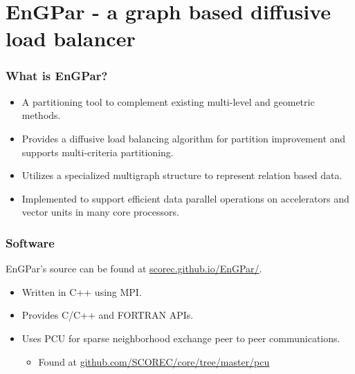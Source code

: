 \documentclass{beamer}
\begin{document}

\section{EnGPar - a graph based diffusive load balancer}

\begin{frame}
  \frametitle{What is EnGPar?}
  \begin{itemize}
  \item A partitioning tool to complement existing multi-level and geometric methods.
  \item Provides a diffusive load balancing algorithm for partition improvement and supports multi-criteria partitioning.
  \item Utilizes a specialized multigraph structure to represent relation based data.
  \item Implemented to support efficient data parallel operations on accelerators and vector units in many core processors.
  \end{itemize}
\end{frame}

\begin{frame}
  \frametitle{Software}
  EnGPar's source can be found at \url{scorec.github.io/EnGPar/}.
  \begin{itemize}
  \item Written in C++ using MPI.
  \item Provides C/C++ and FORTRAN APIs.
  \item Uses PCU for sparse neighborhood exchange peer to peer communications.
    \begin{itemize}
      \item Found at \url{github.com/SCOREC/core/tree/master/pcu}
      \end{itemize}
  \end{itemize}
\end{frame}
\end{document}
